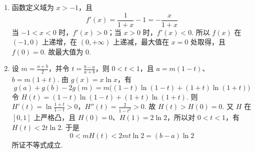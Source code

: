 \begin{solution}
\begin{enumerate}
\item 函数定义域为 \(x>-1\)，且
\[
f'(x)=\frac1{1+x}-1=-\frac{x}{1+x}
\]
当 \(-1<x<0\) 时，\(f'(x)>0\)；当 \(x>0\) 时，\(f'(x)<0\). 所以 \(f(x)\) 在 \((-1,0)\) 上递增，在 \((0,+\infty)\) 上递减，最大值在 \(x=0\) 处取得，且 \(f(0)=0\). 故最大值为 \(0\).

\item 设 \(m=\frac{a+b}{2}\)，并令 \(t=\frac{b-a}{a+b}\)，则 \(0<t<1\)，且 \(a=m(1-t)\)、\(b=m(1+t)\). 由 \(g(x)=x\ln x\)，有
\[
g(a)+g(b)-2g(m)=m\bigl((1-t)\ln(1-t)+(1+t)\ln(1+t)\bigr)
\]
令 \(H(t)=(1-t)\ln(1-t)+(1+t)\ln(1+t)\). 则
\(H'(t)=\ln\frac{1+t}{1-t}>0\)，\(H''(t)=\frac2{1-t^2}>0\).
故 \(H(t)>H(0)=0\). 又 \(H\) 在 \([0,1]\) 上严格凸，且 \(H(0)=0\)、\(H(1)=2\ln2\)，所以对 \(0<t<1\)，有 \(H(t)<2t\ln2\). 于是
\[
0<mH(t)<2mt\ln2=(b-a)\ln2
\]
所证不等式成立.
\end{enumerate}
\end{solution}
